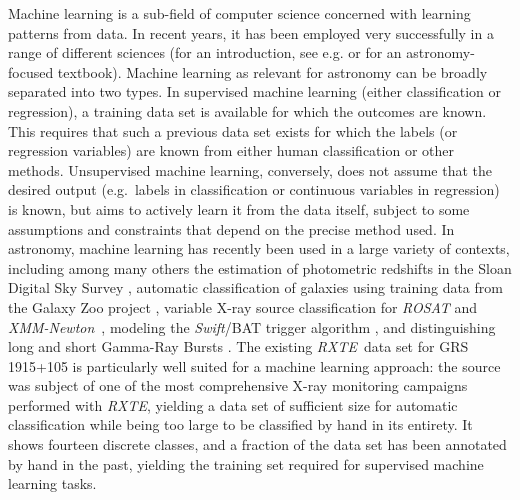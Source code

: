 \documentclass[fleqn,usenatbib]{mnras}
\newcommand{\project}[1]{\textsl{#1}}
\newcommand{\rxte}{\project{RXTE}}
\newcommand{\xmm}{\project{XMM-Newton}}
\newcommand{\rosat}{\project{ROSAT}}
\newcommand{\swift}{\project{Swift}}
\begin{document}
Machine learning is a sub-field of computer science concerned with learning patterns from data. In recent years, it has been employed very successfully in a range of different sciences (for an introduction, see e.g. \citealt{bishop2006} or \citealt{ivezic2014} for an astronomy-focused textbook). Machine learning as relevant for astronomy can be broadly separated into two types. In supervised machine learning (either classification or regression), a training data set is available for which the outcomes are known. This requires that such a previous data set exists for which the labels (or regression variables) are known from either human classification or other methods. %
Unsupervised machine learning, conversely, does not assume that the desired output (e.g.\ labels in classification or continuous variables in regression) is known, but aims to actively learn it from the data itself, subject to some assumptions and constraints that depend on the precise method used. In astronomy, machine learning has recently been used in a large variety of contexts, including among many others the estimation of photometric redshifts in the Sloan Digital Sky Survey \citep{carliles2010, beck2016}, automatic classification of galaxies using training data from the Galaxy Zoo project \citep{banerji2010}, variable X-ray source classification for \rosat \citep{mcglynn2004} and \xmm\ \citep{farrell2015}, modeling the \swift/BAT trigger algorithm \citep{graff2015}, and distinguishing long and short Gamma-Ray Bursts \citep{tarnopolski2015}.
The existing \rxte\ data set for GRS 1915+105 is particularly well suited for a machine learning approach: the source was subject of one of the most comprehensive X-ray monitoring campaigns performed with \rxte, yielding a data set of sufficient size for automatic classification while being too large to be classified by hand in its entirety. It shows fourteen discrete classes, and a fraction of the data set has been annotated by hand in the past, yielding the training set required for supervised machine learning tasks.
\end{document}
